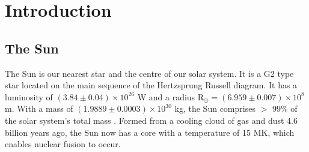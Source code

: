 \onehalfspacing
\chapter{Introduction}
\label{chap:intro}
\section{The Sun}
The Sun is our nearest star and the centre of our solar system. It is a G2 type star located on the main sequence of the Hertzsprung Russell diagram. It has a luminosity of $(3.84 \pm 0.04) \times 10^{26}$ W and a radius R$_\odot = (6.959 \pm 0.007) \times 10^8$ m. With a mass of $(1.9889 \pm 0.0003) \times 10^{30}$ kg, the Sun comprises $>$ 99\% of the solar system's total mass \citep{Foukal2004}. Formed from a cooling cloud of gas and dust 4.6 billion years ago, the Sun now has a core with a temperature of 15 MK, which enables nuclear fusion to occur. %


